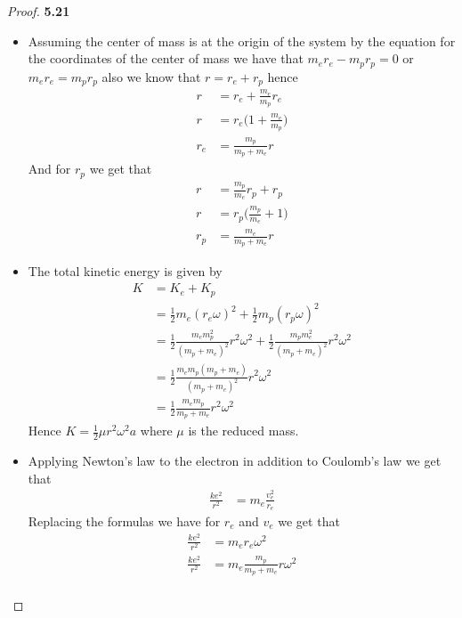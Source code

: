 \documentclass[11pt]{article}
\theoremstyle{definition}
\begin{document}
\cleardoublepage
\begin{proof}{\textbf{5.21}}
\begin{itemize}
    \item [(a)] Assuming the center of mass is at the origin of the system by
    the equation for the coordinates of the center of mass we have that
    $m_er_e - m_p r_p = 0$ or $m_e r_e = m_p r_p$ also we know that
    $r = r_e + r_p$ hence
    \begin{align*}
        r &= r_e + \frac{m_e}{m_p}r_e\\
        r &= r_e\bigg(1 + \frac{m_e}{m_p}\bigg)\\
        r_e &= \frac{m_p}{m_p + m_e}r
    \end{align*}
    And for $r_p$ we get that
    \begin{align*}
        r &= \frac{m_p}{m_e}r_p + r_p\\
        r &= r_p\bigg(\frac{m_p}{m_e} + 1\bigg)\\
        r_p &= \frac{m_e}{m_p + m_e}r
    \end{align*}
    \item [(b)] The total kinetic energy is given by
    \begin{align*}
        K &= K_e + K_p\\
        &= \frac{1}{2}m_e(r_e \omega)^2 + \frac{1}{2}m_p(r_p \omega)^2\\
        &= \frac{1}{2}\frac{m_em_p^2}{(m_p + m_e)^2}r^2 \omega^2
        + \frac{1}{2}\frac{m_pm_e^2}{(m_p + m_e)^2}r^2 \omega^2\\
        &= \frac{1}{2}\frac{m_em_p(m_p + m_e)}{(m_p + m_e)^2}r^2 \omega^2\\
        &= \frac{1}{2}\frac{m_em_p}{m_p + m_e}r^2 \omega^2
    \end{align*}
    Hence $K = \frac{1}{2}\mu r^2 \omega^2a$ where $\mu$ is the reduced mass.
    \item [(c)] Applying Newton's law to the electron in addition to Coulomb's
    law we get that
    \begin{align*}
        \frac{ke^2}{r^2} &= m_e\frac{v_e^2}{r_e}
    \end{align*}
    Replacing the formulas we have for $r_e$ and $v_e$ we get that
    \begin{align*}
        \frac{ke^2}{r^2} &= m_e r_e\omega^2\\
        \frac{ke^2}{r^2} &= m_e\frac{m_p}{m_p + m_e}r \omega^2\\

\end{align*}
\end{itemize}
\end{proof}
\end{document}
